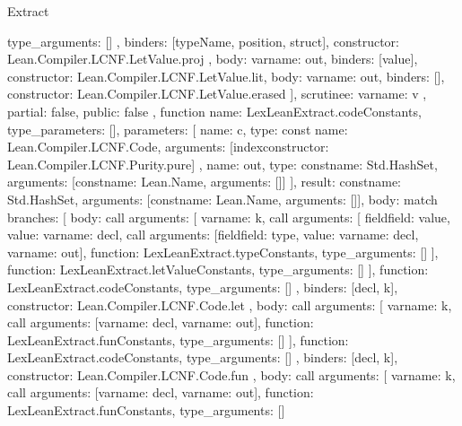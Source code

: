 \begin{lexlean}{Extract}
\begin{toolingmodule}
{{{{{              type_arguments: []
            },
            binders: [typeName, position, struct],
            constructor: Lean.Compiler.LCNF.LetValue.proj
          },
          {body: var{name: out}, binders: [value], constructor: Lean.Compiler.LCNF.LetValue.lit},
          {body: var{name: out}, binders: [], constructor: Lean.Compiler.LCNF.LetValue.erased}
        ],
        scrutinee: var{name: v}
      },
      partial: false,
      public: false
    },
    function{
      name: LexLeanExtract.codeConstants,
      type_parameters: [],
      parameters: [
        {
          name: c,
          type: const{
            name: Lean.Compiler.LCNF.Code,
            arguments: [index{constructor: Lean.Compiler.LCNF.Purity.pure}]
          }
        },
        {
          name: out,
          type: const{name: Std.HashSet, arguments: [const{name: Lean.Name, arguments: []}]}
        }
      ],
      result: const{name: Std.HashSet, arguments: [const{name: Lean.Name, arguments: []}]},
      body: match{
        branches: [
          {
            body: call{
              arguments: [
                var{name: k},
                call{
                  arguments: [
                    field{field: value, value: var{name: decl}},
                    call{
                      arguments: [field{field: type, value: var{name: decl}}, var{name: out}],
                      function: LexLeanExtract.typeConstants,
                      type_arguments: []
                    }
                  ],
                  function: LexLeanExtract.letValueConstants,
                  type_arguments: []
                }
              ],
              function: LexLeanExtract.codeConstants,
              type_arguments: []
            },
            binders: [decl, k],
            constructor: Lean.Compiler.LCNF.Code.let
          },
          {
            body: call{
              arguments: [
                var{name: k},
                call{
                  arguments: [var{name: decl}, var{name: out}],
                  function: LexLeanExtract.funConstants,
                  type_arguments: []
                }
              ],
              function: LexLeanExtract.codeConstants,
              type_arguments: []
            },
            binders: [decl, k],
            constructor: Lean.Compiler.LCNF.Code.fun
          },
          {
            body: call{
              arguments: [
                var{name: k},
                call{
                  arguments: [var{name: decl}, var{name: out}],
                  function: LexLeanExtract.funConstants,
                  type_arguments: []
}}}}}}
\end{toolingmodule}
\end{lexlean}
